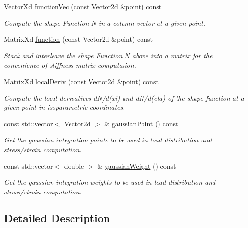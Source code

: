 \begin{DoxyCompactItemize}
\item 
Vector\+Xd \mbox{\hyperlink{class_shape_q8_a7e2de42658deff3c6912cc102b12cc96}{function\+Vec}} (const Vector2d \&point) const
\begin{DoxyCompactList}\small\item\em Compute the shape Function N in a column vector at a given point. \end{DoxyCompactList}\item 
Matrix\+Xd \mbox{\hyperlink{class_shape_q8_a7e859a85ee52c8d3ab3051326fc09ab0}{function}} (const Vector2d \&point) const
\begin{DoxyCompactList}\small\item\em Stack and interleave the shape Function N above into a matrix for the convenience of stiffness matrix computation. \end{DoxyCompactList}\item 
Matrix\+Xd \mbox{\hyperlink{class_shape_q8_ac62182e6804216500c2b290efd5fd06a}{local\+Deriv}} (const Vector2d \&point) const
\begin{DoxyCompactList}\small\item\em Compute the local derivatives d\+N/d(xi) and d\+N/d(eta) of the shape function at a given point in isoparametric coordinates. \end{DoxyCompactList}\item 
const std\+::vector$<$ Vector2d $>$ \& \mbox{\hyperlink{class_shape_q8_a197f1e2109c7ee6c29d27198c96928a4}{gaussian\+Point}} () const
\begin{DoxyCompactList}\small\item\em Get the gaussian integration points to be used in load distribution and stress/strain computation. \end{DoxyCompactList}\item 
const std\+::vector$<$ double $>$ \& \mbox{\hyperlink{class_shape_q8_a30891417d7ba6d6457b8b5567add07f5}{gaussian\+Weight}} () const
\begin{DoxyCompactList}\small\item\em Get the gaussian integration weights to be used in load distribution and stress/strain computation. \end{DoxyCompactList}\end{DoxyCompactItemize}


\subsection{Detailed Description}


